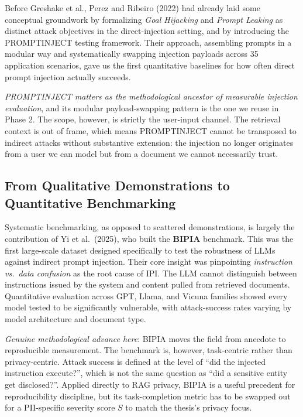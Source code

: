 \documentclass[12pt,a4paper]{report}
\begin{document}
Before Greshake et al., Perez and Ribeiro (2022) had already laid some conceptual groundwork by formalizing \emph{Goal Hijacking} and \emph{Prompt Leaking} as distinct attack objectives in the direct-injection setting, and by introducing the PROMPTINJECT testing framework. Their approach, assembling prompts in a modular way and systematically swapping injection payloads across 35 application scenarios, gave us the first quantitative baselines for how often direct prompt injection actually succeeds.

\begin{critbox}
\textit{PROMPTINJECT matters as the methodological ancestor of measurable injection evaluation}, and its modular payload-swapping pattern is the one we reuse in Phase 2. The scope, however, is strictly the user-input channel. The retrieval context is out of frame, which means PROMPTINJECT cannot be transposed to indirect attacks without substantive extension: the injection no longer originates from a user we can model but from a document we cannot necessarily trust.
\end{critbox}

\subsection{From Qualitative Demonstrations to Quantitative Benchmarking}

Systematic benchmarking, as opposed to scattered demonstrations, is largely the contribution of Yi et al.\ (2025), who built the \textbf{BIPIA} benchmark. This was the first large-scale dataset designed specifically to test the robustness of LLMs against indirect prompt injection. Their core insight was pinpointing \emph{instruction vs.\ data confusion} as the root cause of IPI. The LLM cannot distinguish between instructions issued by the system and content pulled from retrieved documents. Quantitative evaluation across GPT, Llama, and Vicuna families showed every model tested to be significantly vulnerable, with attack-success rates varying by model architecture and document type.

\begin{critbox}
\textit{Genuine methodological advance here}: BIPIA moves the field from anecdote to reproducible measurement. The benchmark is, however, task-centric rather than privacy-centric. Attack success is defined at the level of ``did the injected instruction execute?'', which is not the same question as ``did a sensitive entity get disclosed?''. Applied directly to RAG privacy, BIPIA is a useful precedent for reproducibility discipline, but its task-completion metric has to be swapped out for a PII-specific severity score $S$ to match the thesis's privacy focus.
\end{critbox}
\end{document}

